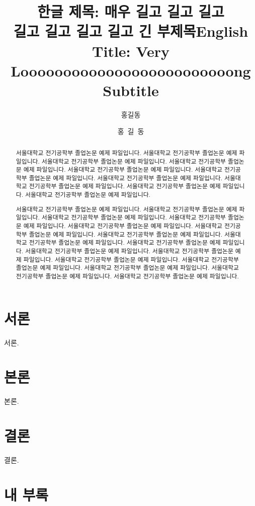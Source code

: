 \documentclass[oneside,ko,phd]{snueethesis}
\title{한글 제목: 매우 길고 길고 길고\\ %
	길고 길고 길고 길고 긴 부제목}
\title*{English Title: Very\\ Looooooooooooooooooooooooong Subtitle}
\author{홍길동}
\author*{홍~길~동} %
\begin{document}
\makefrontcover
\makefrontcover
\makeapproval

\cleardoublepage
{}
\begin{abstract}
서울대학교 전기공학부 졸업논문 예제 파일입니다.
서울대학교 전기공학부 졸업논문 예제 파일입니다.
서울대학교 전기공학부 졸업논문 예제 파일입니다.
서울대학교 전기공학부 졸업논문 예제 파일입니다.
서울대학교 전기공학부 졸업논문 예제 파일입니다.
서울대학교 전기공학부 졸업논문 예제 파일입니다.
서울대학교 전기공학부 졸업논문 예제 파일입니다.
서울대학교 전기공학부 졸업논문 예제 파일입니다.
서울대학교 전기공학부 졸업논문 예제 파일입니다.
서울대학교 전기공학부 졸업논문 예제 파일입니다.

서울대학교 전기공학부 졸업논문 예제 파일입니다.
서울대학교 전기공학부 졸업논문 예제 파일입니다.
서울대학교 전기공학부 졸업논문 예제 파일입니다.
서울대학교 전기공학부 졸업논문 예제 파일입니다.
서울대학교 전기공학부 졸업논문 예제 파일입니다.
서울대학교 전기공학부 졸업논문 예제 파일입니다.
서울대학교 전기공학부 졸업논문 예제 파일입니다.
서울대학교 전기공학부 졸업논문 예제 파일입니다.
서울대학교 전기공학부 졸업논문 예제 파일입니다.
서울대학교 전기공학부 졸업논문 예제 파일입니다.
서울대학교 전기공학부 졸업논문 예제 파일입니다.
서울대학교 전기공학부 졸업논문 예제 파일입니다.
서울대학교 전기공학부 졸업논문 예제 파일입니다.
서울대학교 전기공학부 졸업논문 예제 파일입니다.
서울대학교 전기공학부 졸업논문 예제 파일입니다.
서울대학교 전기공학부 졸업논문 예제 파일입니다.
\end{abstract}

\tableofcontents
\listoftables
\listoffigures

\cleardoublepage
{}

\chapter{서론}
서론.

\chapter{본론}
본론.

\chapter{결론}
결론.

\appendix

\chapter{내 부록}
\lipsum[1-3]
\end{document}
